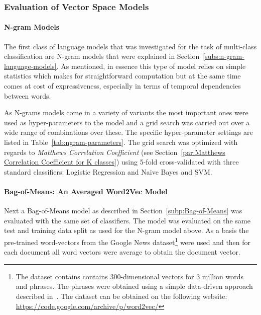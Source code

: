 \subsubsection*{Evaluation of Vector Space Models}
\label{subs:Evaluation of Vector Space Models}

\paragraph{N-gram Models}
\label{par:N-gram Models}

The first class of language models that was investigated for the task of multi-class classification are N-gram models that were explained in Section~\ref{subs:n-gram-language-models}. As mentioned, in essence this type of model relies on simple statistics which makes for straightforward computation but at the same time comes at cost of expressiveness, especially in terms of temporal dependencies between words.

As N-grams models come in a variety of variants the most important ones were used as hyper-parameters to the model and a grid search was carried out over a wide range of combinations over these. The specific hyper-parameter settings are listed in Table~\ref{tab:ngram-parameters}. The grid search was optimized with regards to \emph{Matthews Correlation Coefficient} (see Section~\ref{par:Matthews Correlation Coefficient for K classes}) using 5-fold cross-validated with three standard classifiers: Logistic Regression and Naive Bayes and SVM.

\paragraph{Bag-of-Means: An Averaged Word2Vec Model}
\label{par:Bag-of-Means: An Averaged Word2Vec Model}

Next a Bag-of-Means model as described in Section~\ref{subp:Bag-of-Means} was evaluated with the same set of classifiers. The model was evaluated on the same test and training data split as used for the N-gram model above. As a basis the pre-trained word-vectors from the Google News dataset\footnote{The dataset contains contains 300-dimensional vectors for 3 million words and phrases. The phrases were obtained using a simple data-driven approach described in~\cite{Mikolov:2013ab}. The dataset can be obtained on the following website: \url{https://code.google.com/archive/p/word2vec/}} were used and then for each document all word vectors were average to obtain the document vector.

